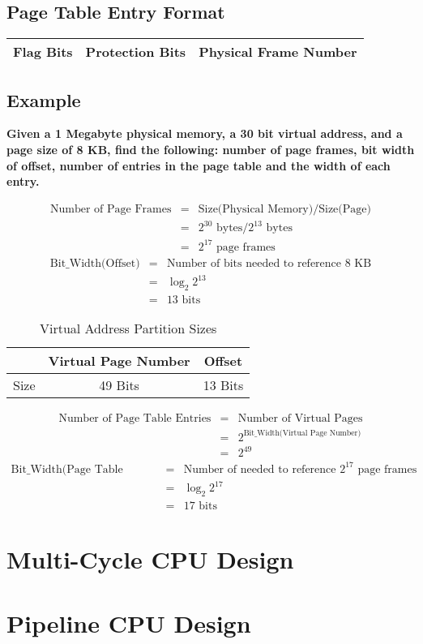 \documentclass[11pt]{article}
\begin{document}
\subsection{Page Table Entry Format}

\begin{table}[H]
	\centering
	\begin{tabular}{| c | c | c |}
		\hline
		Flag Bits	&	Protection Bits	&	Physical Frame Number\\
		\hline
	\end{tabular}
\end{table}

\subsection{Example}

\textbf{Given a 1 Megabyte physical memory, a 30 bit virtual address, and a page size of 8 KB, find the following: number of page frames, bit width of offset, number of entries in the page table and the width of each entry.}

\begin{eqnarray*}
	\text{Number of Page Frames} &=& \text{Size(Physical Memory)} / \text{Size(Page)}\\
		&=& 2^{30} \text{ bytes} / 2^{13} \text{ bytes}\\
		&=& 2^{17} \text{ page frames}
\end{eqnarray*}
\begin{eqnarray*}
	\text{Bit\_Width(Offset)} &=& \text{Number of bits needed to reference 8 KB}\\
	&=& \log_2 2^{13}\\
	&=& 13 \text{ bits}
\end{eqnarray*}
\begin{table}[H]
	\centering
	\caption*{Virtual Address Partition Sizes}
	\begin{tabular}{| c | c | c |}
		\hline
				&	Virtual Page Number	&	Offset\\
		\hline
		Size	&	49 Bits	&	13 Bits\\
		\hline
	\end{tabular}
\end{table}
\begin{eqnarray*}
	\text{Number of Page Table Entries} &=& \text{Number of Virtual Pages}\\
		&=& 2^{\text{Bit\_Width(Virtual Page Number)}}\\
		&=& 2^{49}
\end{eqnarray*}
\begin{eqnarray*}
	\text{Bit\_Width(Page Table Entry)} &=& \text{Number of needed to reference } 2^{17} \text{ page frames}\\
	&=& \log_2 2^{17}\\
	&=& 17 \text{ bits}
\end{eqnarray*}
\section{Multi-Cycle CPU Design}

\section{Pipeline CPU Design}
\end{document}
